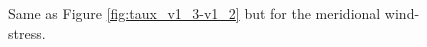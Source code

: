 \documentclass[dvipdfmx]{elsarticle_mod}
\begin{document}
\begin{figure}[h]
  \centering
  \caption{Same as Figure \ref{fig:taux_v1_3-v1_2} but for the meridional wind-stress.}
  \label{fig:tauy_v1_3-v1_2}
\end{figure}
\end{document}
